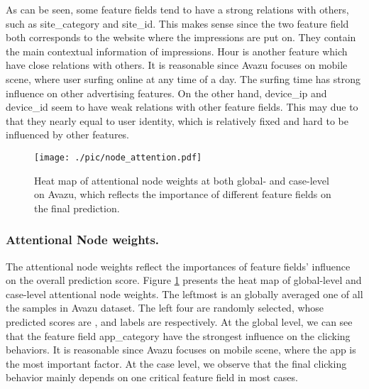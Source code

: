 \documentclass[sigconf]{acmart}
\begin{document}
As can be seen, some feature fields tend to have a strong relations with others, such as \textsf{site\_category} and \textsf{site\_id}.
This makes sense since the two feature field both corresponds to the website where the impressions are put on. They contain the main contextual information of impressions. 
\textsf{Hour} is another feature which have close relations with others. It is reasonable since Avazu focuses on mobile scene, where user surfing online at any time of a day.  
The surfing time has strong influence on other advertising features.  
On the other hand, \textsf{device\_ip} and \textsf{device\_id} seem to have weak relations with other feature fields.
This may due to that they nearly equal to user identity, which is relatively fixed and hard to be influenced by other features. 

\begin{figure}[t]
\centering
\texttt{[image: ./pic/node\_attention.pdf]}
\caption{Heat map of attentional node weights at both global- and case-level on Avazu, which reflects the importance of different feature fields on the final prediction.}
\label{fig:heatmap_node}
\vspace{-5mm}
\end{figure}

\subsubsection{\textbf{Attentional Node weights.}}
The attentional node weights reflect the importances of feature fields' influence on the overall prediction score.
Figure \ref{fig:heatmap_node} presents the heat map of global-level and case-level attentional node weights.
The leftmost is an globally averaged one of all the samples in Avazu dataset.
The left four are randomly selected, whose predicted scores are , and labels are  respectively. 
At the global level, we can see that the feature field \textsf{app\_category} have the strongest influence on the clicking behaviors. 
It is reasonable since Avazu focuses on mobile scene, where the app is the most important factor. 
At the case level, we observe that the final clicking behavior mainly depends on one critical feature field in most cases.
\end{document}
